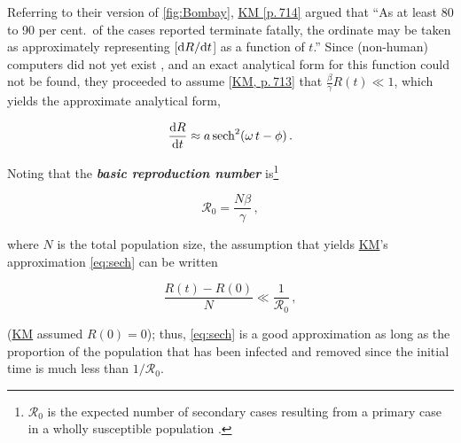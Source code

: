 \documentclass[]{interact}\usepackage[]{graphicx}\usepackage[]{xcolor}
\theoremstyle{plain}%
\theoremstyle{definition}
\theoremstyle{remark}
\newcommand{\term}[1]{{\bfseries\slshape#1}}
\newcommand{\dee}{{\rm d}}
\newcommand{\dd}[2]{{\frac{\dee{#1}}{\dee{#2}}}}
\newcommand{\dbyd}[2]{{{\dee{#1}}/{\dee{#2}}}}
\newcommand{\ddt}[1]{\dd{#1}{t}}
\newcommand{\dbydt}[1]{\dbyd{#1}{t}}
\newcommand{\sech}{\,\textrm{sech}}
\newcommand{\R}{{\mathcal R}}
\newcommand{\Rn}{\R_0}
\newcommand{\KM}{\protect\hyperlink{cite.KermMcKe27}{KM}\xspace}
\newcommand{\KMpage}[1]{\protect\hyperlink{cite.KermMcKe27}{KM [p.\,#1]}\xspace}
\newcommand{\KMpagep}[1]{[\protect\hyperlink{cite.KermMcKe27}{KM, p.\,#1}]\xspace}
\newcommand{\Rinit}{R(0)}
\begin{document}
Referring to their version of \cref{fig:Bombay}, \KMpage{714} argued
that ``As at least 80 to 90 per cent.\ of the cases reported terminate
fatally, the ordinate may be taken as approximately representing
[$\dbydt{R}$] as a function of $t$.''  Since (non-human) computers did
not yet exist \citep{Camp09}, and an exact analytical form for this
function could not be found, they proceeded to assume
\KMpagep{713} that $\frac{\beta}{\gamma}R(t)\ll1$, which
yields the approximate analytical form,
\begin{linenomath*}
\begin{equation}\label{eq:sech}
\ddt{R} \approx a \sech^2{(\omega\,t - \phi)}\,.
\end{equation}
\end{linenomath*}
Noting that the \term{basic reproduction number} is\footnote{$\Rn$ is
the expected number of secondary cases resulting from a primary case
in a wholly susceptible population \citep{AndeMay91}.}
\begin{linenomath*}
\begin{equation}\label{eq:R0def}
\Rn = \frac{N\beta}{\gamma} \,,
\end{equation}
\end{linenomath*}
where $N$ is the total population size,
the assumption that yields \KM's approximation \eqref{eq:sech}
can be written
\begin{linenomath*}
\begin{equation}\label{eq:KMassumption}
\frac{R(t)-\Rinit}{N} \ll \frac{1}{\Rn} \,,
\end{equation}
\end{linenomath*}
(\KM assumed $\Rinit=0$); thus,
\cref{eq:sech} is a good approximation as long as
the proportion of the population that has been infected and
removed since the initial time is much less than $1/\Rn$.
\end{document}
